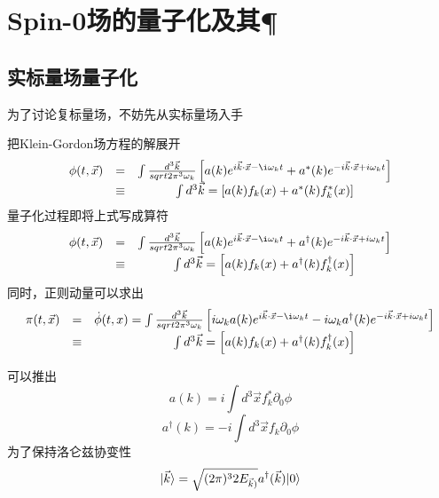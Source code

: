
\section{Spin-0场的量子化及其\C \P \T}
\subsection{实标量场量子化}
为了讨论复标量场，不妨先从实标量场入手

把Klein-Gordon场方程的解展开
\begin{equation}
    \begin{array}{ccc}
        \phi(t, \vec x) &=& \int \VolumeUnit k \omega \left[ a(k) e^{i\vec k \cdot \vec x - \i\omega_k t} + a^*(k)e^{-i\vec k \cdot \vec x + i \omega_k t} \right] \\
        &\equiv& \int d^3\vec k = \left[a(k)f_k(x) + a^*(k)f_k^*(x)\right]
    \end{array}
\end{equation}
量子化过程即将上式写成算符
\begin{equation}
    \begin{array}{ccc}
        \phi(t, \vec x) &=& \int \VolumeUnit k \omega \left[ a(k) e^{i\vec k \cdot \vec x - \i\omega_k t} + a^\dagger(k)e^{-i\vec k \cdot \vec x + i \omega_k t} \right] \\
        &\equiv& \int d^3\vec k = \left[a(k)f_k(x) + a^\dagger(k)f_k^\dagger(x)\right]
    \end{array}
\end{equation}
同时，正则动量可以求出
\begin{equation}
    \begin{array}{ccc}
        \pi(t, \vec x) &=& \dot \phi(t, x) = \int \VolumeUnit k \omega \left[ i\omega_k a(k) e^{i\vec k \cdot \vec x - \i\omega_k t} - i\omega_k a^\dagger(k)e^{-i\vec k \cdot \vec x + i \omega_k t} \right] \\
        &\equiv& \int d^3\vec k = \left[a(k)f_k(x) + a^\dagger(k)f_k^\dagger(x)\right]
    \end{array}
    \end{equation}

    可以推出
    \begin{equation}
        a(k) = i \int d^3 \vec x f_k^*\partial_0\phi
    \end{equation}
    \begin{equation}
        a^\dagger(k) = -i \int d^3 \vec x f_k\partial_0\phi
    \end{equation}
    为了保持洛仑兹协变性
    \begin{equation}
    |\vec k\rangle = \sqrt{(2\pi)^32E_{\vec k)}} a^\dagger(\vec k)|0\rangle
\end{equation}

